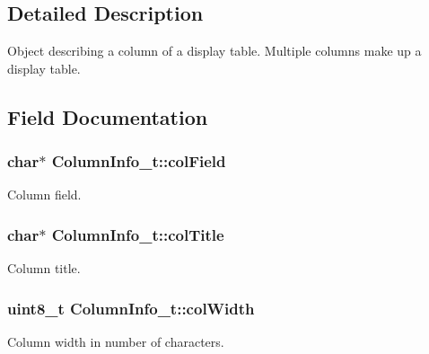 \subsection{Detailed Description}
Object describing a column of a display table. Multiple columns make up a display table. 

\subsection{Field Documentation}
\subsubsection[{\texorpdfstring{col\+Field}{colField}}]{\setlength{\rightskip}{0pt plus 5cm}char$\ast$ Column\+Info\+\_\+t\+::col\+Field}\hypertarget{struct_column_info__t_a71386967e2d59e8ac3f29de5604b1e2a}{}\label{struct_column_info__t_a71386967e2d59e8ac3f29de5604b1e2a}


Column field. 

\subsubsection[{\texorpdfstring{col\+Title}{colTitle}}]{\setlength{\rightskip}{0pt plus 5cm}char$\ast$ Column\+Info\+\_\+t\+::col\+Title}\hypertarget{struct_column_info__t_a602a4e6bfc5f338334b093287d3a1057}{}\label{struct_column_info__t_a602a4e6bfc5f338334b093287d3a1057}


Column title. 

\subsubsection[{\texorpdfstring{col\+Width}{colWidth}}]{\setlength{\rightskip}{0pt plus 5cm}uint8\+\_\+t Column\+Info\+\_\+t\+::col\+Width}\hypertarget{struct_column_info__t_a8702e40adb6e49dc927c368121333508}{}\label{struct_column_info__t_a8702e40adb6e49dc927c368121333508}


Column width in number of characters. 

